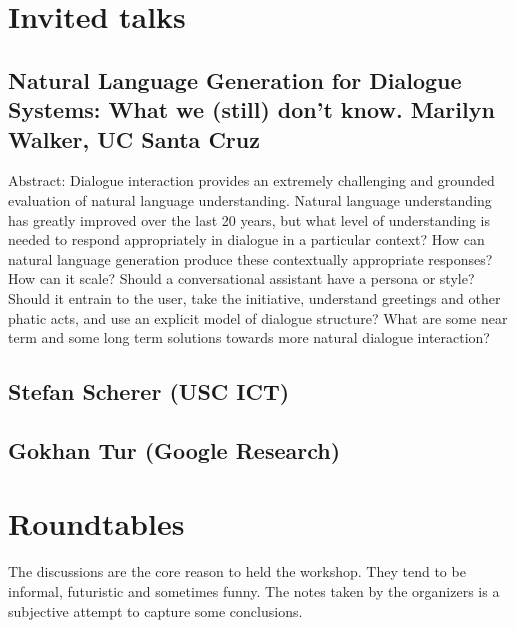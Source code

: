 \documentclass[12pt]{article}
\begin{document}

\tableofcontents
\pagebreak


\section{Invited talks}
\subsection{Natural Language Generation for Dialogue Systems: What we (still) don't know. Marilyn Walker, UC Santa Cruz}
Abstract:  Dialogue interaction provides an extremely challenging and grounded evaluation of natural language understanding. Natural language understanding has greatly improved over the last 20 years, but what level of understanding is needed to respond appropriately in dialogue in a particular context? How can natural language generation produce these contextually appropriate responses? How can it scale? Should a conversational assistant have a persona or style? Should it entrain to the user, take the initiative, understand greetings and other phatic acts, and use an explicit model of dialogue structure? What are some near term and some
long term solutions towards more natural dialogue interaction?

\subsection{Stefan Scherer (USC ICT)}
\subsection{Gokhan Tur (Google Research)}

\section{Roundtables}
The discussions are the core reason to held the workshop.
They tend to be informal, futuristic and sometimes funny.
The notes taken by the organizers is a subjective attempt to capture some conclusions.
\end{document}
